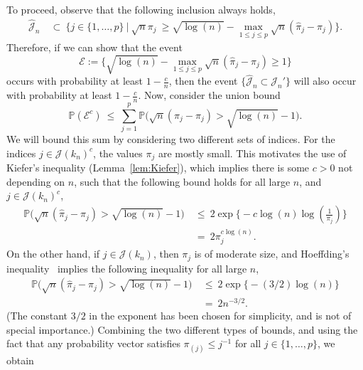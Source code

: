 \documentclass[aos,preprint]{imsart}
\numberwithin{equation}{section}
\theoremstyle{plain}
\renewcommand{\hat}[1]{\widehat{#1}}
\newcommand{\J}{\mathcal{J}}
\renewcommand{\P}{\mathbb{P}}
\newcommand{\ts}{\textstyle}
\newcommand{\1}{{\bf{1}}}
\newcommand{\0}{\mathbf{0}}
\begin{document}
To proceed,
observe that the following inclusion always holds,
\begin{equation}
\begin{split}
\hat{\mathcal{J}}_n
%
& \ \subset \ \Big\{ j\in\{1,\dots,p\} \ \Big| \  \sqrt{n}\pi_j \ \geq \sqrt{\log(n)} - \max_{1\leq j\leq p}\sqrt{n}(\hat\pi_j-\pi_j)\Big\}.
\end{split}
\end{equation}
Therefore, if we can show that the event 
$$\mathcal{E}:=\Big\{ \sqrt{\log(n)} - \max_{1\leq j\leq p}\sqrt{n}(\hat\pi_j-\pi_j) \geq 1\Big\}$$ 
occurs with probability at least $1-\frac cn$, then the event $\{\hat\J_n\subset \J_n'\}$ will also occur with probability at least $1-\frac cn$. Now, consider the union bound
\begin{equation}
\P(\mathcal{E}^c) \ \leq \  \sum_{j=1}^p \P\Big(\sqrt{n}(\hat\pi_j-\pi_j) > \sqrt{\log(n)}-1\Big).
\end{equation}
We will bound this sum by considering two different sets of indices. For the indices $j\in\J(k_n)^c$, the values $\pi_j$ are mostly small. This motivates the use of Kiefer's inequality (Lemma~\ref{lem:Kiefer}), which implies there is some $c>0$ not depending on $n$, such that the following bound holds for all large $n$, and $j\in\J(k_n)^c$,
\begin{equation}
\begin{split}
\P\Big(\sqrt{n}(\hat\pi_j-\pi_j) > \sqrt{\log(n)}-1\Big) & \ \leq \ 2\exp\Big\{-c\log(n)\log(\ts\frac{1}{\pi_j})\Big\}\\[0.2cm]
%
& \ = \ 2 \pi_j^{c\log(n)}.
%
\end{split}
\end{equation}
On the other hand, if $j\in\J(k_n)$, then $\pi_j$ is of moderate size, and Hoeffding's inequality~\cite[p.460]{vanderVaart:Wellner:2000} implies the following inequality for all large $n$,
\begin{equation}
\begin{split}
\P\Big(\sqrt{n}(\hat\pi_j-\pi_j) > \sqrt{\log(n)}-1\Big) & \ \leq \ 2\exp\big\{-(3/2)\log(n)\big\}\\[0.2cm]
%
& \ = \ 2 n^{-3/2}.
%
\end{split}
\end{equation}
(The constant $3/2$ in the exponent has been chosen for simplicity, and is not of special importance.) Combining the two different types of bounds, and using the fact that any probability vector satisfies $\pi_{(j)}\leq j^{-1}$ for all $j\in\{1,\dots,p\}$, we obtain
\end{document}
